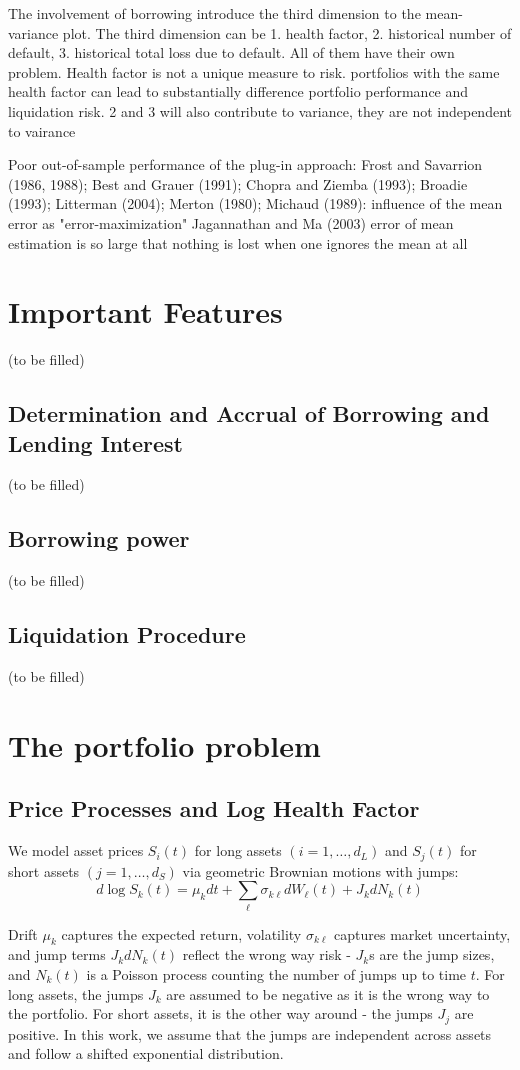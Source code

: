 \documentclass{article} %
\theoremstyle{plain}
\theoremstyle{definition} %
\begin{document}
The involvement of borrowing introduce the third dimension to the mean-variance plot. 
 The third dimension can be 1. health factor, 2. historical number of default, 3. historical total loss due to default. 
 All of them have their own problem.
 Health factor is not a unique measure to risk. portfolios with the same health factor can lead to substantially difference portfolio performance and liquidation risk.
 2 and 3 will also contribute to variance, they are not independent to vairance

Poor out-of-sample performance of the plug-in approach: Frost and Savarrion (1986, 1988); Best and Grauer (1991); Chopra and Ziemba (1993); Broadie (1993); 
Litterman (2004); Merton (1980); 
Michaud (1989): influence of the mean error as "error-maximization"
Jagannathan and Ma (2003) error of mean estimation is so large that nothing is lost when one ignores the mean at all


\section{Important Features}
(to be filled)
\subsection{Determination and Accrual of Borrowing and Lending Interest}
(to be filled)
\subsection{Borrowing power}
(to be filled)
\subsection{Liquidation Procedure}
(to be filled)


\section{The portfolio problem}
\subsection{Price Processes and Log Health Factor}
We model asset prices $S_i(t)$ for long assets $(i = 1,\dots,d_L)$ and $S_j(t)$ for short assets $(j = 1,\dots,d_S)$ via geometric Brownian motions with jumps:
\[
d\log S_k(t) = \mu_k dt + \sum_{\ell} \sigma_{k\ell} dW_\ell(t) + J_k dN_k(t)
\]

Drift $\mu_k$ captures the expected return, volatility $\sigma_{k\ell}$ captures market uncertainty, 
and jump terms $J_k dN_k(t)$ reflect the wrong way risk - $J_k$s are the jump sizes, and $N_k(t)$ is a Poisson process counting the number of jumps up to time $t$.
For long assets, the jumps $J_k$ are assumed to be negative as it is the wrong way to the portfolio. 
For short assets, it is the other way around - the jumps $J_j$ are positive.
In this work, we assume that the jumps are independent across assets and follow a shifted exponential distribution.
\end{document}
